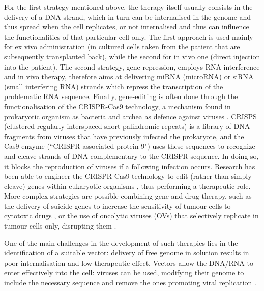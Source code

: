 For the first strategy mentioned above, the therapy itself usually consists in the delivery of a DNA strand, which in turn can be internalised in the genome and thus spread when the cell replicates, or not internalised and thus can influence the functionalities of that particular cell only. The first approach is used mainly for ex vivo administration (in cultured cells taken from the patient that are subsequently transplanted back), while the second for in vivo one (direct injection into the patient).
%
The second strategy, gene repression, employs RNA interference and in vivo therapy, therefore aims at delivering miRNA (microRNA) or siRNA (small interfering RNA) strands which repress the transcription of the problematic RNA sequence.
%
Finally, gene-editing is often done through the functionalisation of the CRISPR-Cas9 technology, a mechanism found in prokaryotic organism as bacteria and archea as defence against viruses \cite{Barrangou2015}.
CRISPS (clustered regularly interspaced short palindromic repeats) is a library of DNA fragments from viruses that have previously infected the prokaryote, and the Cas9 enzyme (``CRISPR-associated protein 9") uses these sequences to recognize and cleave strands of DNA complementary to the CRISPR sequence. In doing so, it blocks the reproduction of viruses if a following infection occurs. Research has been able to engineer the CRISPR-Cas9 technology to edit (rather than simply cleave) genes within eukaryotic organisms \cite{Zhang2014cas,Hsu2014}, thus performing a therapeutic role.
%
More complex strategies are possible combining gene and drug therapy, such as the delivery of suicide genes to increase the sensitivity of tumour cells to cytotoxic drugs \cite{Oldfield1993}, or the use of oncolytic viruses (OVs) that selectively replicate in tumour cells only, disrupting them \cite{Lawler2017}.

One of the main challenges in the development of such therapies lies in the identification of a suitable vector: delivery of free genome in solution results in poor internalisation and low therapeutic effect. Vectors allow the DNA/RNA to enter effectively into the cell: viruses can be used, modifying their genome to include the necessary sequence and remove the ones promoting viral replication \cite{Naldini2011,Mingozzi2011}.
%

